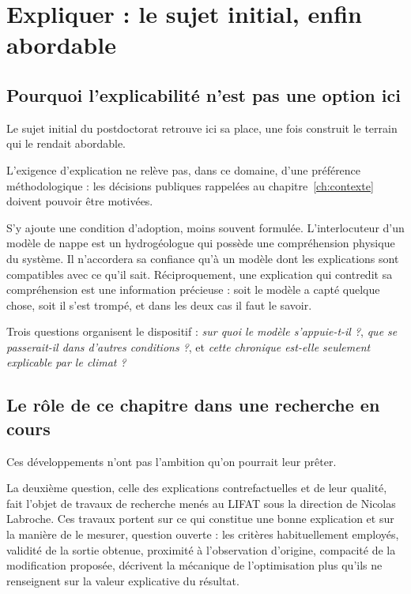\chapter{Expliquer : le sujet initial, enfin abordable}
\label{ch:xai}


\section{Pourquoi l'explicabilité n'est pas une option ici}

Le sujet initial du postdoctorat retrouve ici sa place, une fois construit le terrain qui le
rendait abordable.

L'exigence d'explication ne relève pas, dans ce domaine, d'une préférence méthodologique : les
décisions publiques rappelées au chapitre~\ref{ch:contexte} doivent pouvoir être motivées.

S'y ajoute une condition d'adoption, moins souvent formulée. L'interlocuteur d'un modèle de nappe est un hydrogéologue
qui possède une compréhension physique du système. Il n'accordera sa confiance qu'à un modèle
dont les explications sont compatibles avec ce qu'il sait. Réciproquement, une explication
qui contredit sa compréhension est une information précieuse : soit le modèle a capté quelque
chose, soit il s'est trompé, et dans les deux cas il faut le savoir.

Trois questions organisent le dispositif : \emph{sur quoi le modèle s'appuie-t-il ?},
\emph{que se passerait-il dans d'autres conditions ?}, et \emph{cette chronique est-elle
seulement explicable par le climat ?}

\section{Le rôle de ce chapitre dans une recherche en cours}

Ces développements n'ont pas l'ambition qu'on pourrait leur prêter.

La deuxième question, celle des explications contrefactuelles et de leur qualité, fait l'objet
de travaux de recherche menés au LIFAT sous la direction de Nicolas Labroche. Ces travaux
portent sur ce qui constitue une bonne explication et sur la manière de le mesurer, question
ouverte : les critères habituellement employés, validité de la sortie obtenue, proximité à
l'observation d'origine, compacité de la modification proposée, décrivent la mécanique de
l'optimisation plus qu'ils ne renseignent sur la valeur explicative du résultat.

